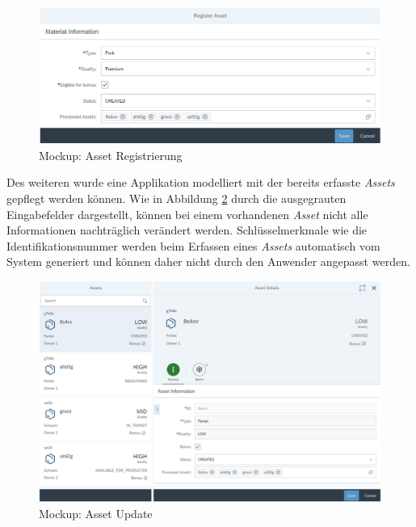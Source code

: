 \begin{figure}[H]
	\centering
	\includegraphics[width=1\linewidth]{pictures/ui-register-asset}
	\caption[Mockup: Asset Registrierung]{Mockup: Asset Registrierung}
	\label{fig:ui-register-asset}
\end{figure}

Des weiteren wurde eine Applikation modelliert mit der bereits erfasste \textit{Assets} gepflegt werden können. Wie in Abbildung \ref{fig:ui-update-asset} durch die ausgegrauten Eingabefelder dargestellt, können bei einem vorhandenen \textit{Asset} nicht alle Informationen nachträglich verändert werden. Schlüsselmerkmale wie die Identifikationsnummer werden beim Erfassen eines \textit{Assets} automatisch vom System generiert und können daher nicht durch den Anwender angepasst werden.

\begin{figure}[H]
	\centering
	\includegraphics[width=1\linewidth]{pictures/ui-update-asset}
	\caption[Mockup: Asset Update]{Mockup: Asset Update}
	\label{fig:ui-update-asset}
\end{figure}

